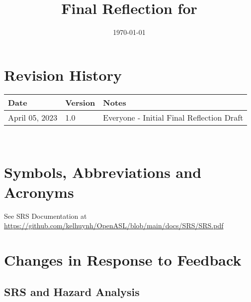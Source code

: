 \documentclass[12pt, titlepage]{article}
\begin{document}
\title{Final Reflection for \progname{}} 
\author{\authname}
\date{\today}

\maketitle


\section{Revision History}

\begin{tabularx}{\textwidth}{p{3cm}p{2cm}X}
\toprule {\bf Date} & {\bf Version} & {\bf Notes}\\
\midrule
April 05, 2023 & 1.0 & Everyone - Initial Final Reflection Draft\\
\bottomrule
\end{tabularx}

~\newpage

\section{Symbols, Abbreviations and Acronyms}

See SRS Documentation at \url{https://github.com/kelhuynh/OpenASL/blob/main/docs/SRS/SRS.pdf}

\newpage

\tableofcontents

\newpage


\section{Changes in Response to Feedback}

\subsection{SRS and Hazard Analysis}
\end{document}
